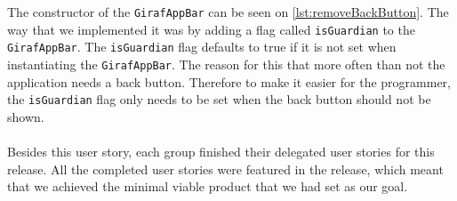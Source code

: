 The constructor of the \texttt{GirafAppBar} can be seen on \autoref{lst:removeBackButton}. 
The way that we implemented it was by adding a flag called \texttt{isGuardian} to the \texttt{GirafAppBar}. 
The \texttt{isGuardian} flag defaults to true if it is not set when instantiating the \texttt{GirafAppBar}.
The reason for this that more often than not the application needs a back button.
Therefore to make it easier for the programmer, the \texttt{isGuardian} flag only needs to be set when the back button should not be shown.
\\\\
Besides this user story, each group finished their delegated user stories for this release.
All the completed user stories were featured in the release, which meant that we achieved the minimal viable product that we had set as our goal. 
